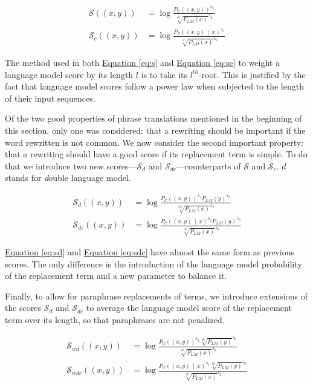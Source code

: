 \documentclass[a4paper, 11pt, onepage]{scrreprt}
\newcommand\equaref[1]{\hyperref[#1]{Equation \ref*{#1}}}
\newcommand\card[1]{\lvert #1 \rvert}
\newcommand\given{\, \middle| \,}
\newcommand\proba[2][]{P_{#1} \left( #2 \right)}
\begin{document}
\begin{align}
  \label{eq:s}
  \mathcal{S}((x, y)) & = \log \frac%
  {\proba[\mathcal{C}]{(x, y)}^{\lambda_1}}%
  {\sqrt[\card{x}]{\proba[LM]{x}}^{\lambda_2}} \\
  \label{eq:sc}
  \mathcal{S}_{c}((x, y)) & = \log \frac%
  {\proba[\mathcal{C}]{(x, y) \given x}^{\lambda_1}}%
  {\sqrt[\card{x}]{\proba[LM]{x}}^{\lambda_2}}
\end{align}

The method used in both \equaref{eq:s} and \equaref{eq:sc} to
weight a language model score by its length $l$ is to take its
$l^{th}$-root. This is justified by the fact that language model
scores follow a power law when subjected to the length of their input
sequences.

Of the two good properties of phrase translations mentioned in the
beginning of this section, only one was considered: that a rewriting
should be important if the word rewritten is not common. We now
consider the second important property: that a rewriting should have a
good score if its replacement term is simple. To do that we introduce
two new scores—$\mathcal{S}_d$ and $\mathcal{S}_{dc}$—counterparts of
$\mathcal{S}$ and $\mathcal{S}_c$. $d$ stands for \emph{d}ouble
language model.

\begin{align}
  \label{eq:sd}
  \mathcal{S}_d((x, y)) & = \log \frac%
  {\proba[\mathcal{C}]{(x, y)}^{\lambda_1}\proba[LM]{y}^{\lambda_3}}%
  {\sqrt[\card{w}]{\proba[LM]{x}}^{\lambda_2}} \\
  \label{eq:sdc}
  \mathcal{S}_{dc}((x, y)) & = \log \frac%
  {\proba[\mathcal{C}]{(x, y) \given x}^{\lambda_1}\proba[LM]{y}^{\lambda_3}}%
  {\sqrt[\card{x}]{\proba[LM]{x}}^{\lambda_2}}
\end{align}

\equaref{eq:sd} and \equaref{eq:sdc} have almost the same form as
previous scores. The only difference is the introduction of the
language model probability of the replacement term and a new parameter
to balance it.

Finally, to allow for paraphrase replacements of terms, we introduce
extensions of the scores $\mathcal{S}_d$ and $\mathcal{S}_{dc}$ to
average the language model score of the replacement term over its
length, so that paraphrases are not penalized.

\begin{align}
  \label{eq:swd}
  \mathcal{S}_{wd}((x, y)) & = \log \frac%
  {\proba[\mathcal{C}]{(x, y)}^{\lambda_1}\sqrt[\card{y}]{\proba[LM]{y}}^{\lambda_3}}%
  {\sqrt[\card{w}]{\proba[LM]{x}}^{\lambda_2}} \\
  \label{eq:swdc}
  \mathcal{S}_{wdc}((x, y)) & = \log \frac%
  {\proba[\mathcal{C}]{(x, y) \given x}^{\lambda_1}\sqrt[\card{y}]{\proba[LM]{y}}^{\lambda_3}}%
  {\sqrt[\card{x}]{\proba[LM]{x}}^{\lambda_2}}
\end{align}
\end{document}
